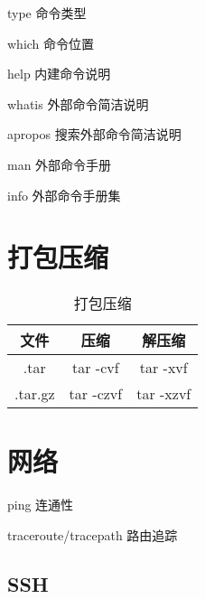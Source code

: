 \documentclass[12pt]{ctexart}
\theoremstyle{definition}
\begin{document}
    type 命令类型

    which 命令位置

    help 内建命令说明

    whatis 外部命令简洁说明

    apropos 搜索外部命令简洁说明

    man 外部命令手册

    info 外部命令手册集

    \section{打包压缩}

    \begin{table}[htbp]
        \centering
        \begin{tabular}{|c|c|c}
            \hline
            文件 & 压缩 & 解压缩\\
            \hline
            .tar & tar -cvf & tar -xvf\\
            \hline
            .tar.gz & tar -czvf & tar -xzvf\\
            \hline
        \end{tabular}
        \caption{打包压缩}
    \end{table}

    \section{网络}

    ping 连通性

    traceroute/tracepath 路由追踪

    \subsection{SSH}
\end{document}
